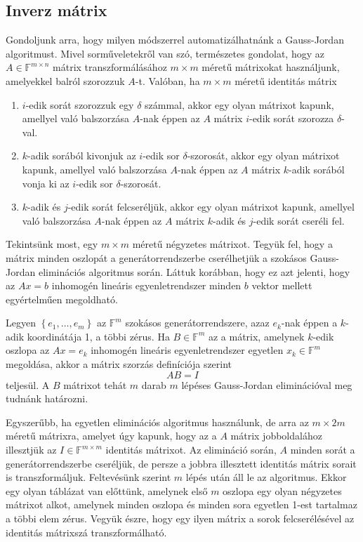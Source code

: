 \documentclass[9pt, showtrims]{memoir}
\theoremstyle{plain}
\theoremstyle{remark}
\theoremstyle{definition}
\renewcommand{\mathbf}{\mathbb}
\begin{document}
\subsection{Inverz mátrix}
Gondoljunk arra, hogy milyen módszerrel automatizálhatnánk a Gauss-Jordan algoritmust.
Mivel sorműveletekről van szó, természetes gondolat, hogy az $A\in\mathbb{F}^{m\times n}$
mátrix transzformálásához $m\times m$ méretű mátrixokat használjunk,
amelyekkel balról szorozzuk $A$-t.
Valóban, ha $m\times m$ méretű identitás mátrix 
\begin{enumerate}
    \item 
        $i$-edik sorát szorozzuk egy $\delta$ számmal,
        akkor egy olyan mátrixot kapunk, 
        amellyel való balszorzása $A$-nak éppen az $A$ mátrix 
        $i$-edik sorát szorozza $\delta$-val.
    \item
        $k$-adik sorából kivonjuk az $i$-edik sor $\delta$-szorosát,
        akkor egy olyan mátrixot kapunk, 
        amellyel való balszorzása $A$-nak éppen az $A$ mátrix 
        $k$-adik sorából vonja ki az $i$-edik sor $\delta$-szorosát.
    \item
        $k$-adik és $j$-edik sorát felcseréljük,
        akkor egy olyan mátrixot kapunk, 
        amellyel való balszorzása $A$-nak éppen az $A$ mátrix 
        $k$-adik és $j$-edik sorát cseréli fel.
\end{enumerate}

Tekintsünk most, egy $m\times m$ méretű négyzetes mátrixot.
Tegyük fel, hogy a mátrix minden oszlopát a generátorrendszerbe cserélhetjük
a szokásos Gauss-Jordan eliminációs algoritmus során.
Láttuk korábban, hogy ez azt jelenti, hogy az $Ax=b$ inhomogén lineáris egyenletrendszer
minden $b$ vektor mellett egyértelműen megoldható.

Legyen $\left\{ e_1,\dots,e_m \right\}$ az $\mathbf{F}^m$ szokásos generátorrendszere,
azaz $e_k$-nak éppen a $k$-adik koordinátája 1, a többi zérus.
Ha $B\in\mathbf{F}^m$ az a mátrix, 
amelynek $k$-edik oszlopa az $Ax=e_k$ inhomogén lineáris egyenletrendszer egyetlen $x_k\in\mathbf{F}^m$ megoldása,
akkor a mátrix szorzás definíciója szerint 
\[
    AB=I
\]
teljesül.
A $B$ mátrixot tehát $m$ darab $m$ lépéses Gauss-Jordan eliminációval meg tudnánk határozni.

Egyszerűbb, 
ha egyetlen eliminációs algoritmus használunk, de arra az $m\times 2m$ méretű mátrixra,
amelyet úgy kapunk, hogy az a $A$ mátrix jobboldalához illesztjük az $I\in\mathbf{F}^{m\times m}$ identitás mátrixot.
Az elimináció során, 
$A$ minden sorát a generátorrendszerbe cseréljük, de persze a jobbra illesztett identitás
mátrix sorait is transzformáljuk.
Feltevésünk szerint $m$ lépés után áll le az algoritmus.
Ekkor egy  olyan táblázat van előttünk, amelynek első $m$ oszlopa egy olyan négyzetes
mátrixot alkot, amelynek minden oszlopa és minden sora egyetlen 1-est tartalmaz a többi elem zérus. 
Vegyük észre, 
hogy egy ilyen mátrix a sorok felcserélésével az identitás mátrixszá transzformálható.
\end{document}
